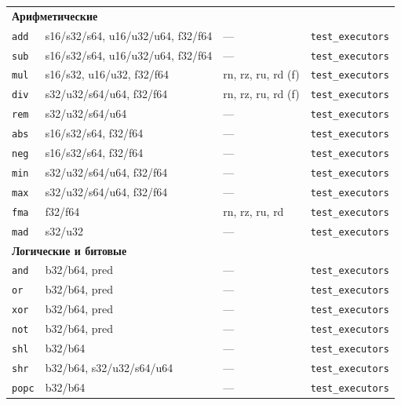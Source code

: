 \begin{longtable}{p{4cm} p{5cm} p{2cm} p{3.5cm}}
  \multicolumn{4}{l}{\textbf{Арифметические}} \\
  \texttt{add}  & s16/s32/s64, u16/u32/u64, f32/f64 & --- & \texttt{test\_executors} \\
  \texttt{sub}  & s16/s32/s64, u16/u32/u64, f32/f64 & --- & \texttt{test\_executors} \\
  \texttt{mul}  & s16/s32, u16/u32, f32/f64          & rn, rz, ru, rd (f) & \texttt{test\_executors} \\
  \texttt{div}  & s32/u32/s64/u64, f32/f64           & rn, rz, ru, rd (f) & \texttt{test\_executors} \\
  \texttt{rem}  & s32/u32/s64/u64                    & ---             & \texttt{test\_executors} \\
  \texttt{abs}  & s16/s32/s64, f32/f64               & ---             & \texttt{test\_executors} \\
  \texttt{neg}  & s16/s32/s64, f32/f64               & ---             & \texttt{test\_executors} \\
  \texttt{min}  & s32/u32/s64/u64, f32/f64           & ---             & \texttt{test\_executors} \\
  \texttt{max}  & s32/u32/s64/u64, f32/f64           & ---             & \texttt{test\_executors} \\
  \texttt{fma}  & f32/f64                            & rn, rz, ru, rd     & \texttt{test\_executors} \\
  \texttt{mad}  & s32/u32                            & ---             & \texttt{test\_executors} \\
  \midrule
  \multicolumn{4}{l}{\textbf{Логические и битовые}} \\
  \texttt{and}  & b32/b64, pred                      & ---  & \texttt{test\_executors} \\
  \texttt{or}   & b32/b64, pred                      & ---  & \texttt{test\_executors} \\
  \texttt{xor}  & b32/b64, pred                      & ---  & \texttt{test\_executors} \\
  \texttt{not}  & b32/b64, pred                      & ---  & \texttt{test\_executors} \\
  \texttt{shl}  & b32/b64                            & ---  & \texttt{test\_executors} \\
  \texttt{shr}  & b32/b64, s32/u32/s64/u64           & ---  & \texttt{test\_executors} \\
  \texttt{popc} & b32/b64                            & ---  & \texttt{test\_executors} \\

\end{longtable}
